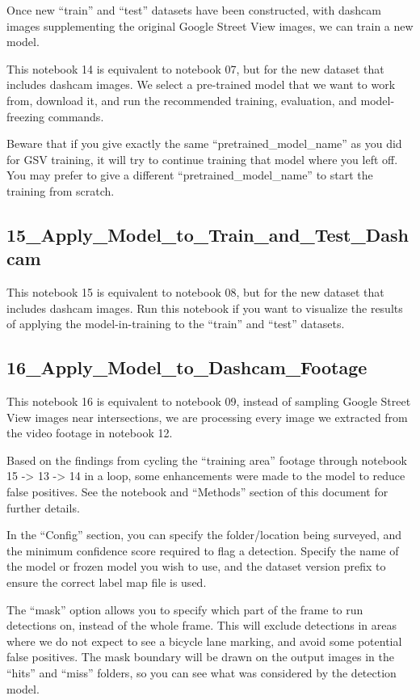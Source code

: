 \documentclass[11pt,twoside]{report}
\begin{document}
Once new ``train'' and ``test'' datasets have been constructed, with dashcam images supplementing the original Google Street View images, we can train a new model.

This notebook 14 is equivalent to notebook 07, but for the new dataset that includes dashcam images.  We select a pre-trained model that we want to work from, download it, and run the recommended training, evaluation, and model-freezing commands.

Beware that if you give exactly the same ``pretrained\_model\_name'' as you did for GSV training, it will try to continue training that model where you left off.  You may prefer to give a different ``pretrained\_model\_name'' to start the training from scratch.


\subsection{15\_Apply\_Model\_to\_Train\_and\_Test\_Dashcam}
\label{a15}

This notebook 15 is equivalent to notebook 08, but for the new dataset that includes dashcam images.  Run this notebook if you want to visualize the results of applying the model-in-training to the ``train'' and ``test'' datasets.


\subsection{16\_Apply\_Model\_to\_Dashcam\_Footage}
\label{a16}

This notebook 16 is equivalent to notebook 09, instead of sampling Google Street View images near intersections, we are processing every image we extracted from the video footage in notebook 12.

Based on the findings from cycling the ``training area'' footage through notebook 15 -> 13 -> 14 in a loop, some enhancements were made to the model to reduce false positives.  See the notebook and ``Methods'' section of this document for further details.

In the ``Config'' section, you can specify the folder/location being surveyed, and the minimum confidence score required to flag a detection.  Specify the name of the model or frozen model you wish to use, and the dataset version prefix to ensure the correct label map file is used.

The ``mask'' option allows you to specify which part of the frame to run detections on, instead of the whole frame.  This will exclude detections in areas where we do not expect to see a bicycle lane marking, and avoid some potential false positives.  The mask boundary will be drawn on the output images in the ``hits'' and ``miss'' folders, so you can see what was considered by the detection model.
\end{document}
